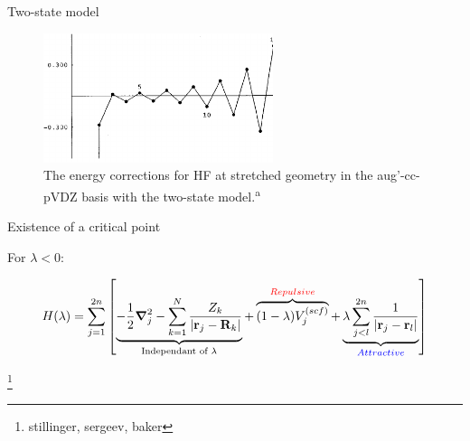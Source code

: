 \documentclass[xcolor=x11names,compress]{beamer}
\renewcommand{\(}{\begin{columns}}
\renewcommand{\)}{\end{columns}}
\newcommand{\<}[1]{\begin{column}{#1}}
\renewcommand{\>}{\end{column}}
\begin{document}
\begin{frame}{Two-state model}
  
\begin{figure}
    \centering
    \includegraphics[width=0.6\textwidth]{figure-fig14.png}
    \caption{\centering The energy corrections for HF at stretched geometry in the aug'-cc-pVDZ basis with the two-state model.\textsuperscript{a}}
    \label{fig:my_label}
\end{figure}
    

\end{frame}

\begin{frame}{Existence of a critical point}

For $\lambda<0$:

\begin{equation*}
    H(\lambda)=\sum\limits_{j=1}^{2n}\left[ \underbrace{-\frac{1}{2}\grad_j^2 - \sum\limits_{k=1}^{N} \frac{Z_k}{|\vb{r}_j-\vb{R}_k|}}_{\text{Independant of }\lambda} + \overbrace{(1-\lambda)V_j^{(scf)}}^{\textcolor{red}{Repulsive}}+\underbrace{\lambda\sum\limits_{j<l}^{2n}\frac{1}{|\vb{r}_j-\vb{r}_l|}}_{\textcolor{blue}{Attractive}}  \right]
\end{equation*}

\footnote{stillinger, sergeev, baker}

\end{frame}
\end{document}
